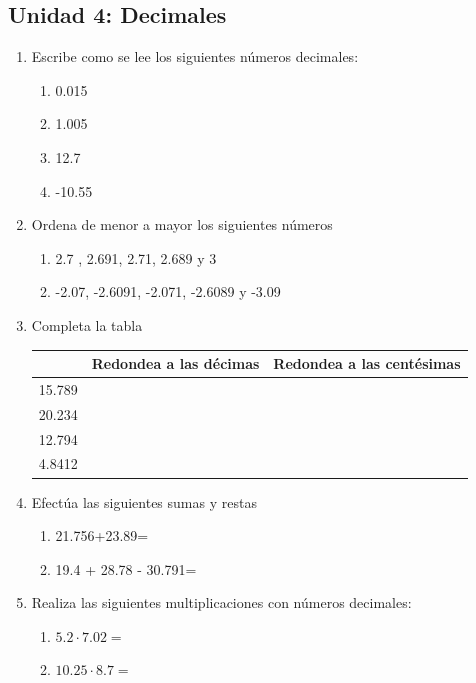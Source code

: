 \documentclass[a4paper,12pt]{article}
\begin{document}
\subsection*{Unidad 4: Decimales}
    \begin{enumerate}
        \item Escribe como se lee los siguientes números decimales:
        \begin{enumerate}
            \item 0.015
            \item 1.005
            \item 12.7
            \item -10.55
        \end{enumerate}
        \item Ordena de menor a mayor los siguientes números
            \begin{enumerate}
                \item 2.7 , 2.691, 2.71, 2.689 y 3
                \item -2.07, -2.6091, -2.071, -2.6089 y -3.09
            \end{enumerate}
        \item Completa la tabla
            \begin{tabular}{| c | c | c |}
                \hline
                  & Redondea a las décimas & Redondea a las centésimas \\
                \hline
                15.789&&\\ 
                \hline
                20.234&&\\ 
                \hline
                12.794&&\\ 
                \hline
                4.8412&&\\ 
                \hline
            \end{tabular}
        \item Efectúa las siguientes sumas y restas
            \begin{enumerate}
                \item 21.756+23.89=
                \item 19.4 + 28.78 - 30.791=
            \end{enumerate}
        \item Realiza las siguientes multiplicaciones con números decimales:
            \begin{enumerate}
                \item $5.2 \cdot 7.02 = $
                \item $10.25 \cdot 8.7 = $

\end{enumerate}
\end{enumerate}
\end{document}
